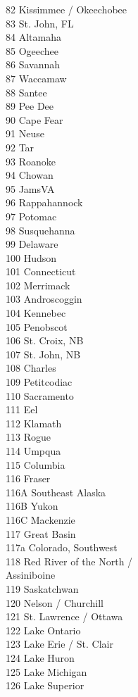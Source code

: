 \documentclass[11pt]{article}
\begin{document}
\begin{multicols}{3}
82 Kissimmee / Okeechobee\\
83 St. John, FL\\
84 Altamaha\\
85 Ogeechee\\
86 Savannah\\
87 Waccamaw\\
88 Santee\\
89 Pee Dee\\
90 Cape Fear\\
91 Neuse\\
92 Tar\\
93 Roanoke\\
94 Chowan\\
95 JamsVA\\
96 Rappahannock\\
97 Potomac\\
98 Susquehanna\\
99 Delaware\\
100 Hudson\\
101 Connecticut\\
102 Merrimack\\
103 Androscoggin\\
104 Kennebec\\
105 Penobscot\\
106 St. Croix, NB\\
107 St. John, NB\\
108 Charles\\
109 Petitcodiac\\
110 Sacramento\\
111 Eel\\
112 Klamath\\
113 Rogue\\
114 Umpqua\\
115 Columbia\\
116 Fraser\\
116A Southeast Alaska\\
116B Yukon\\
116C Mackenzie\\
117 Great Basin\\
117a Colorado, Southwest\\
118 Red River of the North /\\ \qquad Assiniboine\\
119 Saskatchwan\\
120 Nelson / Churchill\\
121 St. Lawrence / Ottawa\\
122 Lake Ontario\\
123 Lake Erie / St. Clair\\
124 Lake Huron\\
125 Lake Michigan\\
126 Lake Superior
\end{multicols}
\end{document}
